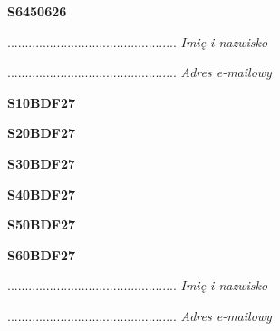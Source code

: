 \begin{turn}{90}\huge \textbf{S6450626}\end{turn}

\begin{turn}{90}\begin{minipage}{\linewidth} \vspace{20mm} ................................................  \textit{Imię i nazwisko}\end{minipage}\end{turn}

\begin{turn}{90}\begin{minipage}{\linewidth} \vspace{20mm} ................................................  \textit{Adres e-mailowy}\end{minipage}\end{turn}

\begin{turn}{90}\huge \textbf{S10BDF27}\end{turn}

\begin{turn}{90}\huge \textbf{S20BDF27}\end{turn}

\begin{turn}{90}\huge \textbf{S30BDF27}\end{turn}

\begin{turn}{90}\huge \textbf{S40BDF27}\end{turn}

\begin{turn}{90}\huge \textbf{S50BDF27}\end{turn}

\begin{turn}{90}\huge \textbf{S60BDF27}\end{turn}

\begin{turn}{90}\begin{minipage}{\linewidth} \vspace{20mm} ................................................  \textit{Imię i nazwisko}\end{minipage}\end{turn}

\begin{turn}{90}\begin{minipage}{\linewidth} \vspace{20mm} ................................................  \textit{Adres e-mailowy}\end{minipage}\end{turn}

